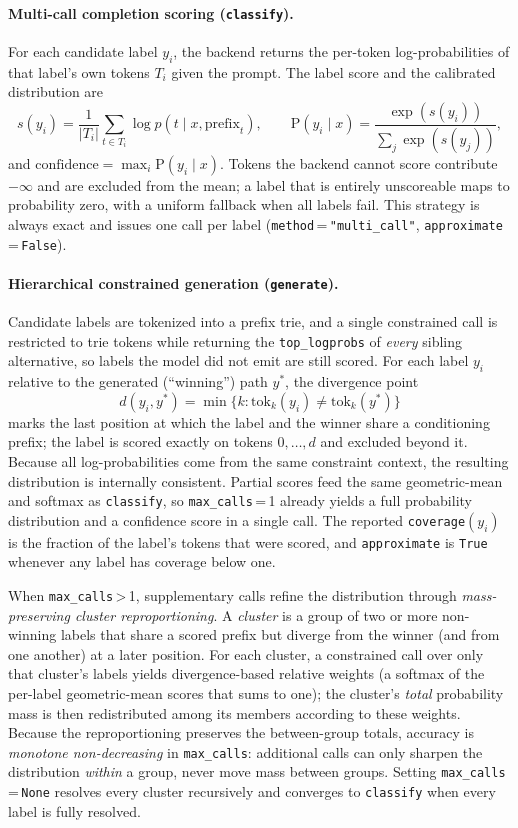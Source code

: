 \documentclass[11pt,a4paper]{article}
\begin{document}
\paragraph{Multi-call completion scoring (\texttt{classify}).}
For each candidate label $y_i$, the backend returns the per-token
log-probabilities of that label's own tokens $T_i$ given the prompt. The
label score and the calibrated distribution are
\[
  s(y_i)=\frac{1}{|T_i|}\sum_{t\in T_i}\log p\!\left(t\mid x,\text{prefix}_t\right),
  \qquad
  \text{P}(y_i\mid x)=\frac{\exp\!\left(s(y_i)\right)}{\sum_{j}\exp\!\left(s(y_j)\right)},
\]
and $\text{confidence}=\max_i \text{P}(y_i\mid x)$. Tokens the backend cannot
score contribute $-\infty$ and are excluded from the mean; a label that is
entirely unscoreable maps to probability zero, with a uniform fallback when
all labels fail. This strategy is always exact and issues one call per label
(\texttt{method}\,=\,\texttt{"multi\_call"}, \texttt{approximate}\,=\,\texttt{False}).

\paragraph{Hierarchical constrained generation (\texttt{generate}).}
Candidate labels are tokenized into a prefix trie, and a single constrained
call is restricted to trie tokens while returning the \texttt{top\_logprobs}
of \emph{every} sibling alternative, so labels the model did not emit are still
scored. For each label $y_i$ relative to the generated (``winning'') path
$y^\ast$, the divergence point
\[
  d(y_i,y^\ast)=\min\bigl\{k:\text{tok}_k(y_i)\neq\text{tok}_k(y^\ast)\bigr\}
\]
marks the last position at which the label and the winner share a
conditioning prefix; the label is scored exactly on tokens $0,\dots,d$ and
excluded beyond it. Because all log-probabilities come from the same
constraint context, the resulting distribution is internally consistent.
Partial scores feed the same geometric-mean and softmax as \texttt{classify},
so \texttt{max\_calls}\,=\,1 already yields a full probability distribution
and a confidence score in a single call. The reported
\texttt{coverage}$(y_i)$ is the fraction of the label's tokens that were
scored, and \texttt{approximate} is \texttt{True} whenever any label has
coverage below one.

When \texttt{max\_calls}\,>\,1, supplementary calls refine the distribution
through \emph{mass-preserving cluster reproportioning}. A \emph{cluster} is a
group of two or more non-winning labels that share a scored prefix but diverge
from the winner (and from one another) at a later position. For each cluster,
a constrained call over only that cluster's labels yields divergence-based
relative weights (a softmax of the per-label geometric-mean scores that sums to
one); the cluster's \emph{total} probability mass is then redistributed among
its members according to these weights. Because the reproportioning preserves
the between-group totals, accuracy is \emph{monotone non-decreasing} in
\texttt{max\_calls}: additional calls can only sharpen the distribution
\emph{within} a group, never move mass between groups. Setting
\texttt{max\_calls}\,=\,\texttt{None} resolves every cluster recursively and
converges to \texttt{classify} when every label is fully resolved.
\end{document}
